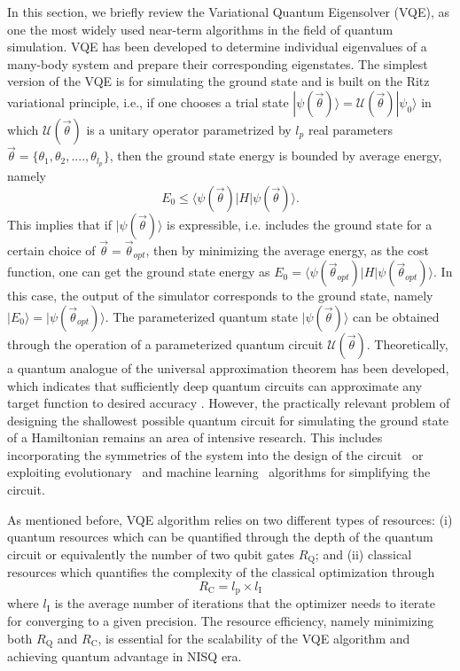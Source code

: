 \documentclass[aps, pra, reprint, superscriptaddress]{revtex4-1}
\begin{document}
In this section, we briefly review the Variational Quantum Eigensolver (VQE), as one the most widely used near-term algorithms in the field of quantum simulation. VQE has been developed to determine individual eigenvalues of a many-body system and prepare their corresponding eigenstates.  The simplest version of the VQE is for simulating the ground state and is built on the Ritz variational principle, i.e., if one chooses a trial state $|\psi (\vec{\theta})\rangle {=} \mathcal{U}(\vec{\theta}) |\psi_0\rangle$ in which $\mathcal{U}(\vec{\theta})$ is a unitary operator parametrized by $l_p$ real parameters $\vec{\theta} {=} \lbrace \theta_1, \theta_2, ...., \theta_{l_p} \rbrace $, then the ground state energy is bounded by average energy, namely  
\begin{equation}
    E_0 \leq \langle \psi (\vec{\theta})|H|\psi (\vec{\theta})\rangle.
\end{equation}
This implies that if $|\psi (\vec{\theta})\rangle$ is expressible, i.e. includes the ground state for a certain choice of  $\vec{\theta}{=}\vec{\theta}_{opt}$, then by minimizing the average energy, as the cost function, one can get the ground state energy as $E_0{=}\langle \psi (\vec{\theta}_{opt})|H|\psi (\vec{\theta}_{opt})\rangle$. In this case, the output of the simulator corresponds to the ground state, namely $|E_0\rangle{=}|\psi (\vec{\theta}_{opt})\rangle$. The parameterized quantum state $|\psi (\vec{\theta})\rangle$ can be obtained through the operation of a parameterized quantum circuit $\mathcal{U}(\vec{\theta})$. Theoretically, a quantum analogue of the universal approximation theorem has been developed, which indicates that sufficiently deep quantum circuits can approximate any target function to desired accuracy \cite{wu2021expressivity}. However, the practically relevant problem of designing the shallowest possible quantum circuit for simulating the ground state of a Hamiltonian remains an area of intensive research. This includes incorporating the symmetries of the system into the design of the circuit~\cite{gard2020efficient, meyer2023exploiting,Lyu2023symmetry} or exploiting evolutionary~\cite{chivilikhin2020mog,huang2022robust} and machine learning~\cite{ostaszewski2021reinforcement,NEURIPS2021_97244127,PRXQuantum.2.010324} algorithms for simplifying the circuit. 

As mentioned before, VQE algorithm relies on two different types of resources: (i) quantum resources which can be quantified through the depth of the quantum circuit or equivalently the number of two qubit gates $R_\text{Q}$; and (ii) classical resources which quantifies the complexity of the classical optimization through
\begin{equation}
    R_\text{C}=l_\text{p}\times  l_\text{I}
\end{equation}
where $l_\text{I}$ is the average number of iterations that the optimizer needs to iterate for converging to a given precision. The resource efficiency, namely minimizing both $R_{\text{Q}}$ and $R_\text{C}$, is essential for the scalability of the VQE algorithm and achieving quantum advantage in NISQ era. 
\end{document}

